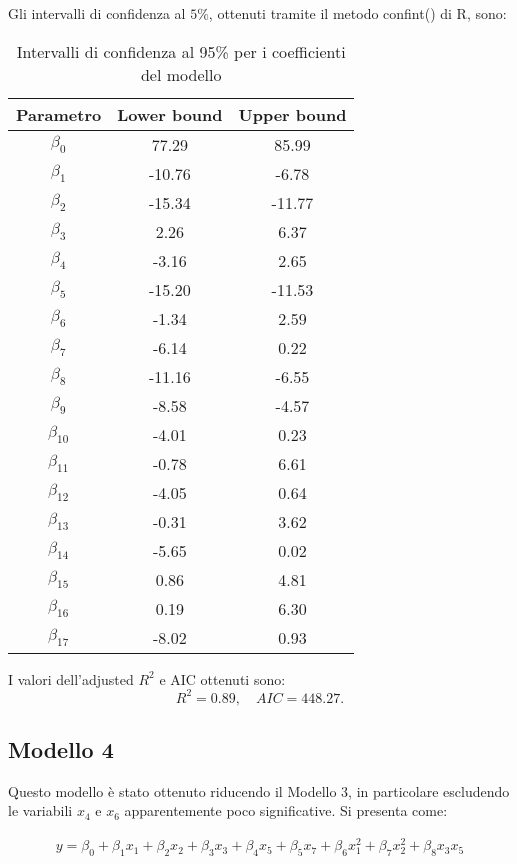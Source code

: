 Gli intervalli di confidenza al $5\%$, ottenuti tramite il metodo confint() di R, sono:
\begin{table}[H]
	\centering
	\begin{tabular}{|c|c|c|}
		\hline
		\textbf{Parametro} & \textbf{Lower bound} & \textbf{Upper bound} \\
		\hline
		$\beta_0$   & 77.29  & 85.99 \\
		$\beta_1$   & -10.76 & -6.78 \\
		$\beta_2$   & -15.34 & -11.77 \\
		$\beta_3$   & 2.26   & 6.37 \\
		$\beta_4$   & -3.16  & 2.65 \\
		$\beta_5$   & -15.20 & -11.53 \\
		$\beta_6$   & -1.34  & 2.59 \\
		$\beta_7$   & -6.14  & 0.22 \\
		$\beta_8$   & -11.16 & -6.55 \\
		$\beta_9$   & -8.58  & -4.57 \\
		$\beta_{10}$ & -4.01  & 0.23 \\
		$\beta_{11}$ & -0.78  & 6.61 \\
		$\beta_{12}$ & -4.05  & 0.64 \\
		$\beta_{13}$ & -0.31  & 3.62 \\
		$\beta_{14}$ & -5.65  & 0.02 \\
		$\beta_{15}$ & 0.86   & 4.81 \\
		$\beta_{16}$ & 0.19   & 6.30 \\
		$\beta_{17}$ & -8.02  & 0.93 \\
		\hline
	\end{tabular}
	\caption{Intervalli di confidenza al 95\% per i coefficienti del modello}
	\label{tab:ci_coefficienti}
\end{table}
I valori dell'adjusted $R^2$  e AIC ottenuti sono:
\begin{equation*}
	R^2 =      0.89, \quad AIC=448.27.
\end{equation*}

\subsection{Modello 4}
Questo modello è stato ottenuto riducendo il Modello 3, in particolare escludendo le variabili $x_4$ e $x_6$ apparentemente poco significative. Si presenta come:

\begin{align*}
	y = \beta_0 + \beta_1x_1 + \beta_2x_2 + \beta_3x_3 + \beta_4x_5 + \beta_5x_7 + \beta_6x_1^2 + \beta_7x_2^2 + \beta_8x_3x_5
\end{align*}


